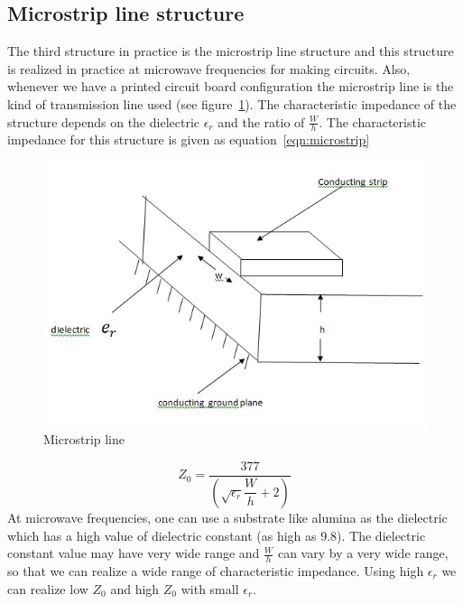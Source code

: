 \subsection{Microstrip line structure}
The third structure in practice is the microstrip line structure and this structure is realized in practice at microwave frequencies for making circuits. Also, whenever we have a printed circuit board configuration the microstrip line is the kind of transmission line used (see figure~\ref{fig:microstrip}). The characteristic impedance of the structure depends on the dielectric $\epsilon_{r}$ and the ratio of $\frac{W}{h}$. The characteristic impedance for this structure is given as equation~\ref{eqn:microstrip}
\begin{figure}[h]
\centering
\includegraphics[width=1\linewidth]{graphics/microstrip}
\caption{Microstrip line}
\label{fig:microstrip}
\end{figure}

\begin{equation}
Z_0 =\dfrac{377}{\left(\sqrt{\epsilon_r}\dfrac{W}{h}+2\right)}
\label{eqn:microstrip}
\end{equation}
At microwave frequencies, one can use a substrate like alumina as the dielectric which has a high value of dielectric constant (as high as 9.8). The dielectric constant value may have very wide range and $\frac{W}{h}$ can vary by a very wide range, so that we can realize a wide range of characteristic impedance. Using high $\epsilon_r$ we can realize low $Z_0$ and high $Z_0$ with small $\epsilon_r$.

